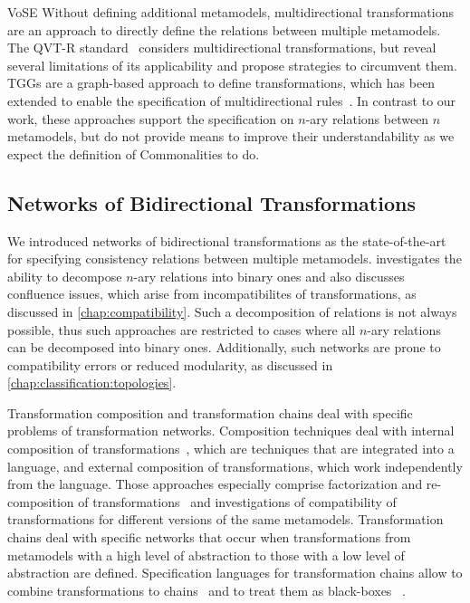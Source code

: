 \begin{copiedFrom}{VoSE}
Without defining additional metamodels, multidirectional transformations are an approach to directly define the relations between multiple metamodels.
The QVT-R standard~\cite{qvt} considers multidirectional transformations, but \textcite{macedo2014FrameworkMultiDirectional-BX} reveal several limitations of its applicability and propose strategies to circumvent them.
\glspl{TGG} are a graph-based approach to define transformations, which has been extended to enable the specification of multidirectional rules~\cite{trollmann2015TransformationTGGtoMultiModel-ICMT, trollmann2016SynchronizationTGGtoMultiModel-ICMT}.
In contrast to our work, these approaches support the specification on $n$-ary relations between $n$ metamodels, but do not provide means to improve their understandability as we expect the definition of Commonalities to do.


\subsection*{Networks of Bidirectional Transformations}

We introduced networks of bidirectional transformations as the state-of-the-art for specifying consistency relations between multiple metamodels.
\textcite{stevens2020BidirectionalTransformationLarge-SoSym} investigates the ability to decompose $n$-ary relations into binary ones and also discusses confluence issues, which arise from incompatibilites of transformations, as discussed in \autoref{chap:compatibility}.
Such a decomposition of relations is not always possible, thus such approaches are restricted to cases where all $n$-ary relations can be decomposed into binary ones.
Additionally, such networks are prone to compatibility errors or reduced modularity, as discussed in \autoref{chap:classification:topologies}.

Transformation composition and transformation chains deal with specific problems of transformation networks.
Composition techniques deal with internal composition of transformations~\cite{wagelaar2008a}, which are techniques that are integrated into a language, and external composition of transformations, which work independently from the language.
Those approaches especially comprise factorization and re-composition of transformations~\cite{cuadrado2008a} and investigations of compatibility of transformations for different versions of the same metamodels.
Transformation chains deal with specific networks that occur when transformations from metamodels with a high level of abstraction to those with a low level of abstraction are defined.
Specification languages for transformation chains %
allow to combine transformations to chains~\cite{lucio2013FTGPM-SDL} and to treat them as black-boxes%
~\cite{vanhooff2006a, vanhooff2007UniTI-MODELS}. 



\end{copiedFrom}
